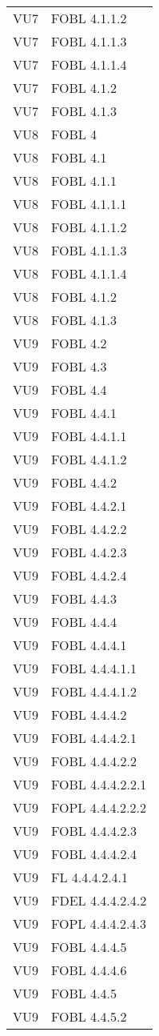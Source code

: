 \begin{longtable}{XX}
VU7&FOBL 4.1.1.2\\ 
VU7&FOBL 4.1.1.3\\ 
VU7&FOBL 4.1.1.4\\ 
VU7&FOBL 4.1.2\\ 
VU7&FOBL 4.1.3\\ 
\midrule 
VU8&FOBL 4\\ 
VU8&FOBL 4.1\\ 
VU8&FOBL 4.1.1\\ 
VU8&FOBL 4.1.1.1\\ 
VU8&FOBL 4.1.1.2\\ 
VU8&FOBL 4.1.1.3\\ 
VU8&FOBL 4.1.1.4\\ 
VU8&FOBL 4.1.2\\ 
VU8&FOBL 4.1.3\\ 
\midrule 
VU9&FOBL 4.2\\ 
VU9&FOBL 4.3\\ 
VU9&FOBL 4.4\\ 
VU9&FOBL 4.4.1\\ 
VU9&FOBL 4.4.1.1\\ 
VU9&FOBL 4.4.1.2\\ 
VU9&FOBL 4.4.2\\ 
VU9&FOBL 4.4.2.1\\ 
VU9&FOBL 4.4.2.2\\ 
VU9&FOBL 4.4.2.3\\ 
VU9&FOBL 4.4.2.4\\ 
VU9&FOBL 4.4.3\\ 
VU9&FOBL 4.4.4\\ 
VU9&FOBL 4.4.4.1\\ 
VU9&FOBL 4.4.4.1.1\\ 
VU9&FOBL 4.4.4.1.2\\ 
VU9&FOBL 4.4.4.2\\ 
VU9&FOBL 4.4.4.2.1\\ 
VU9&FOBL 4.4.4.2.2\\ 
VU9&FOBL 4.4.4.2.2.1\\ 
VU9&FOPL 4.4.4.2.2.2\\ 
VU9&FOBL 4.4.4.2.3\\ 
VU9&FOBL 4.4.4.2.4\\ 
VU9&FL 4.4.4.2.4.1\\ 
VU9&FDEL 4.4.4.2.4.2\\ 
VU9&FOPL 4.4.4.2.4.3\\ 
VU9&FOBL 4.4.4.5\\ 
VU9&FOBL 4.4.4.6\\ 
VU9&FOBL 4.4.5\\ 
VU9&FOBL 4.4.5.2\\ 

\end{longtable}
